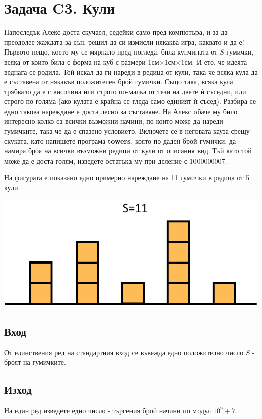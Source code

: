 \documentclass[12pt]{article}
\begin{document}
\section*{Задача C3. Кули}

Напоследък Алекс доста скучаел, седейки само пред компютъра, и за да преодолее жаждата за сън, решил да си измисли някаква игра, каквато и да е! Първото нещо, което му се мярнало пред погледа, била купчината от $S$ гумички, всяка от които била с форма на куб с размери $1$см$\times1$см$\times1$см. И ето, че идеята веднага се родила. Той искал да ги нареди в редица от кули, така че всяка кула да е съставена от някакъв положителен брой гумички. Също така, всяка кула трябвало да е с височина или строго по-малка от тези на двете ѝ съседни, или строго по-голяма (ако кулата е крайна се гледа само единият ѝ съсед). Разбира се едно такова нареждане е доста лесно за съставяне. На Алекс обаче му било интересно колко са всички възможни начини, по които може да нареди гумичките, така че да е спазено условието. Включете се в неговата кауза срещу скуката, като напишете програма \textbf{towers}, която по даден брой гумички, да намира броя на всички възможни редици от кули от описания вид. Тъй като той може да е доста голям, изведете остатъка му при деление с 1000000007.

На фигурата е показано едно примерно нареждане на 11 гумички в редица от 5 кули.
\begin{center}
\includegraphics[scale=0.7]{towers_example_1}
\end{center}

\subsection*{Вход}
От единствения ред на стандартния вход се въвежда едно положително число $S$ - броят на гумичките.

\subsection*{Изход}
На един ред изведете едно число - търсения брой начини по модул $10^9+7$.
\\ \\ \\
\end{document}
